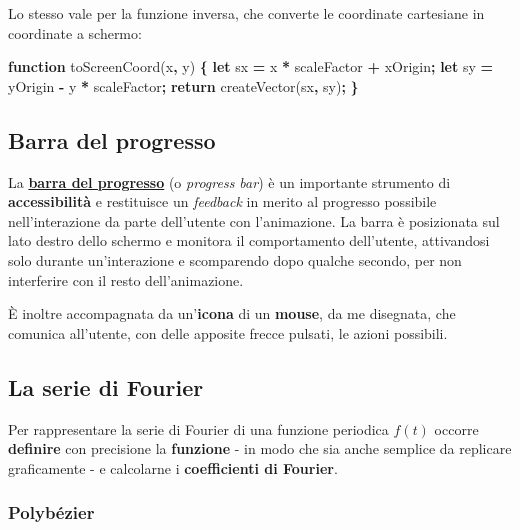\documentclass[
]{book}
\newenvironment{Shaded}{\begin{snugshade}}{\end{snugshade}}
\newcommand{\AttributeTok}[1]{\textcolor[rgb]{0.77,0.63,0.00}{#1}}
\newcommand{\ControlFlowTok}[1]{\textcolor[rgb]{0.13,0.29,0.53}{\textbf{#1}}}
\newcommand{\KeywordTok}[1]{\textcolor[rgb]{0.13,0.29,0.53}{\textbf{#1}}}
\newcommand{\NormalTok}[1]{#1}
\newcommand{\OperatorTok}[1]{\textcolor[rgb]{0.81,0.36,0.00}{\textbf{#1}}}
\begin{document}
Lo stesso vale per la funzione inversa, che converte le coordinate cartesiane in coordinate a schermo:

\begin{Shaded}
\begin{Highlighting}[]
\KeywordTok{function} \AttributeTok{toScreenCoord}\NormalTok{(x}\OperatorTok{,}\NormalTok{ y) }\OperatorTok{\{}
  \KeywordTok{let}\NormalTok{ sx }\OperatorTok{=}\NormalTok{ x }\OperatorTok{*}\NormalTok{ scaleFactor }\OperatorTok{+}\NormalTok{ xOrigin}\OperatorTok{;}
  \KeywordTok{let}\NormalTok{ sy }\OperatorTok{=}\NormalTok{ yOrigin }\OperatorTok{-}\NormalTok{ y }\OperatorTok{*}\NormalTok{ scaleFactor}\OperatorTok{;}
  \ControlFlowTok{return} \AttributeTok{createVector}\NormalTok{(sx}\OperatorTok{,}\NormalTok{ sy)}\OperatorTok{;}
\OperatorTok{\}}
\end{Highlighting}
\end{Shaded}

\hypertarget{progrbar}{%
\subsection{Barra del progresso}\label{progrbar}}

La \href{https://github.com/Bradwave/thesis/blob/master/animations/js/utils/progressGraphics.js}{\textbf{barra del progresso}} (o \emph{progress bar}) è un importante strumento di \textbf{accessibilità} e restituisce un \emph{feedback} in merito al progresso possibile nell'interazione da parte dell'utente con l'animazione. La barra è posizionata sul lato destro dello schermo e monitora il comportamento dell'utente, attivandosi solo durante un'interazione e scomparendo dopo qualche secondo, per non interferire con il resto dell'animazione.

È inoltre accompagnata da un'\textbf{icona} di un \textbf{mouse}, da me disegnata, che comunica all'utente, con delle apposite frecce pulsati, le azioni possibili.

\hypertarget{anserie}{%
\subsection{La serie di Fourier}\label{anserie}}

Per rappresentare la serie di Fourier di una funzione periodica \(f(t)\) occorre \textbf{definire} con precisione la \textbf{funzione} - in modo che sia anche semplice da replicare graficamente - e calcolarne i \textbf{coefficienti di Fourier}.

\hypertarget{polbezier}{%
\subsubsection{Polybézier}\label{polbezier}}
\end{document}
